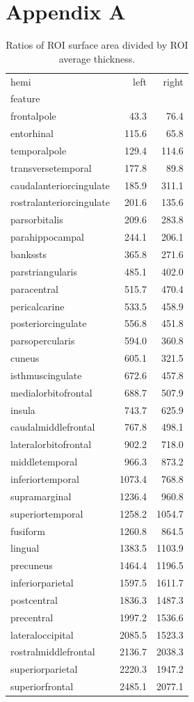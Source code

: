 \documentclass{article}
\begin{document}
\section{Appendix A}\label{sec:appendix-a}



\begin{table}[H]
\centering
\begin{tabular}{lrr}
\toprule
hemi & left & right \\
feature &  &  \\
\midrule
frontalpole & 43.3 & 76.4 \\
entorhinal & 115.6 & 65.8 \\
temporalpole & 129.4 & 114.6 \\
transversetemporal & 177.8 & 89.8 \\
caudalanteriorcingulate & 185.9 & 311.1 \\
rostralanteriorcingulate & 201.6 & 135.6 \\
parsorbitalis & 209.6 & 283.8 \\
parahippocampal & 244.1 & 206.1 \\
bankssts & 365.8 & 271.6 \\
parstriangularis & 485.1 & 402.0 \\
paracentral & 515.7 & 470.4 \\
pericalcarine & 533.5 & 458.9 \\
posteriorcingulate & 556.8 & 451.8 \\
parsopercularis & 594.0 & 360.8 \\
cuneus & 605.1 & 321.5 \\
isthmuscingulate & 672.6 & 457.8 \\
medialorbitofrontal & 688.7 & 507.9 \\
insula & 743.7 & 625.9 \\
caudalmiddlefrontal & 767.8 & 498.1 \\
lateralorbitofrontal & 902.2 & 718.0 \\
middletemporal & 966.3 & 873.2 \\
inferiortemporal & 1073.4 & 768.8 \\
supramarginal & 1236.4 & 960.8 \\
superiortemporal & 1258.2 & 1054.7 \\
fusiform & 1260.8 & 864.5 \\
lingual & 1383.5 & 1103.9 \\
precuneus & 1464.4 & 1196.5 \\
inferiorparietal & 1597.5 & 1611.7 \\
postcentral & 1836.3 & 1487.3 \\
precentral & 1997.2 & 1536.6 \\
lateraloccipital & 2085.5 & 1523.3 \\
rostralmiddlefrontal & 2136.7 & 2038.3 \\
superiorparietal & 2220.3 & 1947.2 \\
superiorfrontal & 2485.1 & 2077.1 \\
\bottomrule
\end{tabular}
\footnotesize
\caption{Ratios of ROI surface area divided by ROI average thickness.}\label{tab:sa-ratios}
\normalsize
\end{table}
\end{document}
